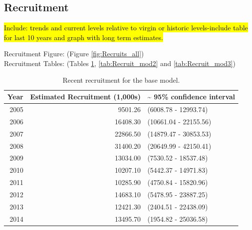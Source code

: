 \documentclass[12pt,]{article}
\begin{document}
\FloatBarrier

\subsection*{Recruitment}\label{recruitment}

\hl{Include: trends and current levels relative to virgin or historic levels-include 
table for last 10 years and graph with long term estimates.}

Recruitment Figure: (Figure \ref{fig:Recruits_all})\\
Recruitment Tables: (Tables \ref{tab:Recruit_mod1},
\ref{tab:Recruit_mod2} and \ref{tab:Recruit_mod3})

\begin{table}[ht]
\centering
\caption{Recent recruitment for the base model.} 
\label{tab:Recruit_mod1}
\begin{tabular}{rrl}
  \hline
Year & Estimated Recruitment (1,000s) & \~{} 95\% confidence interval \\ 
  \hline
2005 & 9501.26 & (6008.78 - 12993.74) \\ 
  2006 & 16408.30 & (10661.04 - 22155.56) \\ 
  2007 & 22866.50 & (14879.47 - 30853.53) \\ 
  2008 & 31400.20 & (20649.99 - 42150.41) \\ 
  2009 & 13034.00 & (7530.52 - 18537.48) \\ 
  2010 & 10207.10 & (5442.37 - 14971.83) \\ 
  2011 & 10285.90 & (4750.84 - 15820.96) \\ 
  2012 & 14683.10 & (5478.95 - 23887.25) \\ 
  2013 & 12421.30 & (2404.51 - 22438.09) \\ 
  2014 & 13495.70 & (1954.82 - 25036.58) \\ 
   \hline
\end{tabular}
\end{table}

\FloatBarrier
\end{document}
